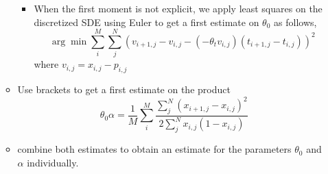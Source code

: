 \documentclass[a4paper, 12pt]{article}
\begin{document}
\begin{itemize}
\begin{itemize}
\begin{itemize}
			\item When the first moment is not explicit, we apply least squares on the discretized SDE using Euler to get a first estimate on $\theta_0$ as follows,
			$$ \arg\min \sum\limits_{i}^M \sum\limits_j^N \left( v_{i+1,j}  - v_{i,j}- \left( - \theta_t v_{i,j}\right) \left(t_{i+1,j} - t_{i,j} \right)  \right)^2 $$ where $v_{i,j}=x_{i,j}-p_{i,j}$
		\end{itemize} %
		\item Use brackets to get a first estimate on the product
		$$\theta_0 \alpha = \frac{1}{M} \sum\limits_i^M \frac{ \sum\limits_j^N (x_{i+1,j}  - x_{i,j})^2}{2 \sum\limits_j^N x_{i,j}(1-x_{i,j}) }$$
		\item combine both estimates to obtain an estimate for the parameters $\theta_0$ and $\alpha$ individually.
	\end{itemize}



\end{itemize}
\end{document}
